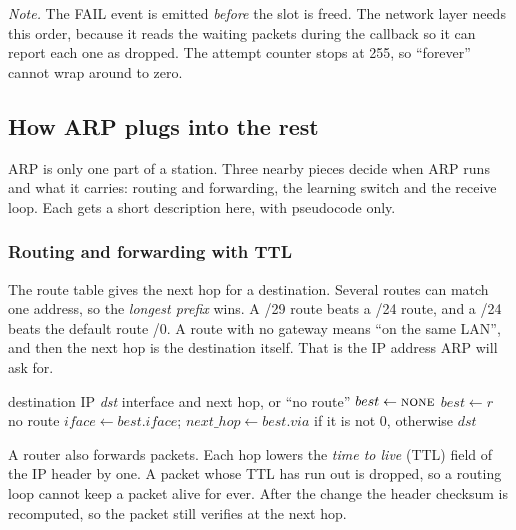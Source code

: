 \emph{Note.} The FAIL event is emitted \emph{before} the slot is freed. The network layer needs this order, because it reads the waiting packets during the callback so it can report each one as dropped. The attempt counter stops at 255, so ``forever'' cannot wrap around to zero.

\subsection{How ARP plugs into the rest}\label{sec:core-glue}
ARP is only one part of a station. Three nearby pieces decide when ARP runs and what it carries: routing and forwarding, the learning switch and the receive loop. Each gets a short description here, with pseudocode only.

\subsubsection{Routing and forwarding with TTL}
The route table gives the next hop for a destination. Several routes can match one address, so the \emph{longest prefix} wins. A /29 route beats a /24 route, and a /24 beats the default route /0. A route with no gateway means ``on the same LAN'', and then the next hop is the destination itself. That is the IP address ARP will ask for.

\begin{algorithm}[H]\small
\caption{Route lookup (,  lines 5--16)}
\label{alg:route}
\begin{algorithmic}[1]
\Require destination IP \textit{dst}
\Ensure interface and next hop, or ``no route''
\State $best \gets \textsc{none}$
    \State $best \gets r$ 
  \EndIf
\EndFor
{} \Return no route
\EndIf
\State $iface \gets best.iface$; $next\_hop \gets best.via$ if it is not 0, otherwise $dst$
\end{algorithmic}
\end{algorithm}

A router also forwards packets. Each hop lowers the \emph{time to live} (TTL) field of the IP header by one. A packet whose TTL has run out is dropped, so a routing loop cannot keep a packet alive for ever. After the change the header checksum is recomputed, so the packet still verifies at the next hop.


